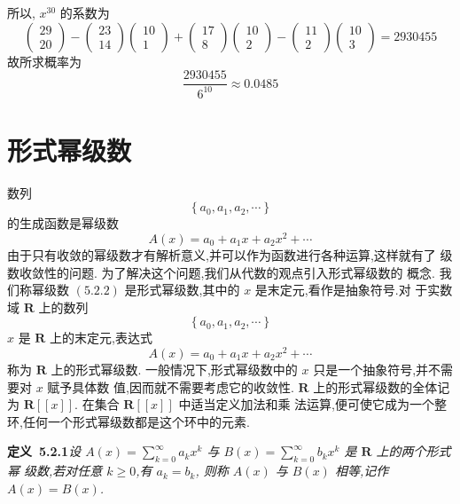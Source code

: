 \documentclass{report}
\begin{document}
所以, $x^{30}$ 的系数为
$$
\left(\begin{array}{c}
29 \\ 20
\end{array}\right)-\left(\begin{array}{c}
23 \\ 14
\end{array}\right)\left(\begin{array}{c}
10 \\ 1
\end{array}\right)+\left(\begin{array}{c}
17 \\ 8
\end{array}\right)\left(\begin{array}{c}
10 \\ 2
\end{array}\right)-\left(\begin{array}{c}
11 \\ 2
\end{array}\right)\left(\begin{array}{c}
10 \\ 3
\end{array}\right)=2930455
$$
故所求概率为
$$
\frac{2930455}{6^{10}} \approx 0.0485
$$

\section{形式幂级数}
数列
$$
\left\{a_{0}, a_{1}, a_{2}, \cdots\right\}
$$
的生成函数是幂级数
$$
A(x)=a_{0}+a_{1} x+a_{2} x^{2}+\cdots
$$
由于只有收敛的幂级数才有解析意义,并可以作为函数进行各种运算,这样就有了 级数收敛性的问题. 为了解决这个问题,我们从代数的观点引入形式幂级数的 概念.
我们称幂级数 $(5.2 .2)$ 是形式幂级数,其中的 $x$ 是末定元,看作是抽象符号.对 于实数域 $\mathbf{R}$ 上的数列
$$
\left\{a_{0}, a_{1}, a_{2}, \cdots\right\}
$$
$x$ 是 $\mathbf{R}$ 上的末定元,表达式
$$
A(x)=a_{0}+a_{1} x+a_{2} x^{2}+\cdots
$$
称为 $\mathbf{R}$ 上的形式幂级数.
一般情况下,形式幂级数中的 $x$ 只是一个抽象符号,并不需要对 $x$ 赋予具体数 值,因而就不需要考虑它的收敛性.
$\mathbf{R}$ 上的形式幂级数的全体记为 $\mathbf{R}[[x]] .$ 在集合 $\mathbf{R}[[x]]$ 中适当定义加法和乘 法运算,便可使它成为一个整环,任何一个形式幂级数都是这个环中的元素.

\noindent
\textbf{定义\ 5.2.1}\textsl {设 $A(x)=\sum_{k=0}^{\infty} a_{k} x^{k}$ 与 $B(x)=\sum_{k=0}^{\infty} b_{k} x^{k}$ 是 $\mathbf{R}$ 上的两个形式幂 级数,若对任意 $k \geqslant 0$,有 $a_{k}=b_{k}$, 则称 $A(x)$ 与 $B(x)$ 相等,记作 $A(x)=B(x)$.}
\end{document}
